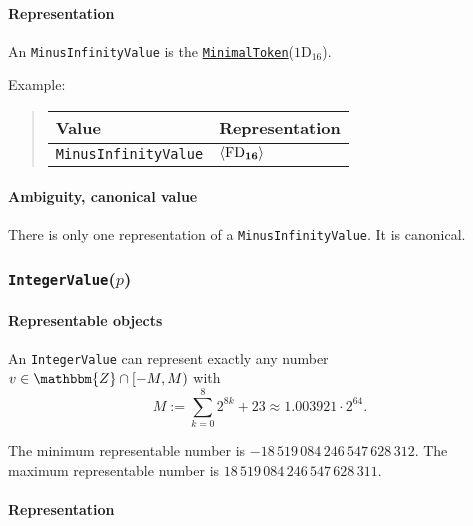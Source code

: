 \documentclass{dbor-article}
\newcommand{\SetOfIntegers}{\mathbbm{Z}}
\newcommand{\HexNumber}[1]{\mathrm{#1}_{16}}
\newcommand{\DborSyntaxIdent}[1]{\texttt{#1}}
\newcommand{\DborSyntaxIdentRef}[1]{\hyperlink{sec:def:#1}{\DborSyntaxIdent{#1}}}
\newcommand{\DborFirstByte}[2]{\mathbf{\textcolor{#1}{\HexNumber{#2}}}}
\newcommand{\DborFirstByteNumber}[1]{\DborFirstByte{black}{#1}}
\begin{document}
    \paragraph{Representation}

    An \DborSyntaxIdent{MinusInfinityValue} is the \DborSyntaxIdentRef{MinimalToken}($\HexNumber{1D}$).

    \smallskip
    \noindent
    Example:
    \nolinebreak
    \begin{quote}    
        \begin{tabular}{ll}
            \toprule
            Value & Representation \\
            \midrule
            \DborSyntaxIdent{MinusInfinityValue} 
                & $\langle \DborFirstByteNumber{FD} \rangle$ \\
            \bottomrule
        \end{tabular}
    \end{quote}

    \paragraph{Ambiguity, canonical value}

    There is only one representation of a \DborSyntaxIdent{MinusInfinityValue}.
    It is canonical.


    \subsubsection{\DborSyntaxIdent{IntegerValue}($p$)}
    \hypertarget{sec:def:IntegerValue}{}

    \paragraph{Representable objects}

    An \DborSyntaxIdent{IntegerValue} can represent exactly any number $v \in \SetOfIntegers \cap [-M, M)$ with
    \begin{equation}
        M := \sum_{k = 0}^8 2^{8k} + 23 \approx 1.003921 \cdot 2^{64}.
    \end{equation}%

    \smallskip
    The minimum representable number is $-18\,519\,084\,246\,547\,628\,312$.
    The maximum representable number is $18\,519\,084\,246\,547\,628\,311$.

    \paragraph{Representation}
\end{document}
